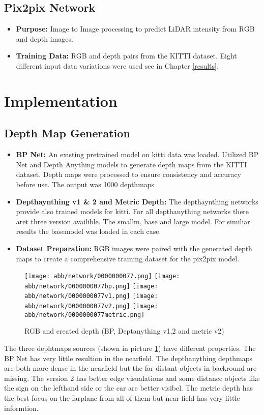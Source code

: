 \subsection{Pix2pix Network}
\begin{itemize}
	\item \textbf{Purpose:} Image to Image processing to predict LiDAR intensity from RGB and depth images.
	\item \textbf{Training Data:} RGB and depth pairs from the KITTI dataset.
	Eight different input data variations were used see in Chapter \ref{results}.
\end{itemize}

\section{Implementation}
\subsection{Depth Map Generation}
\begin{itemize}
	\item \textbf{BP Net:} An existing pretrained model on kitti data was loaded. Utilized BP Net and Depth Anything models to generate depth maps from the KITTI dataset. Depth maps were processed to ensure consistency and accuracy before use. The output was 1000 depthmaps
	
	\item \textbf{Depthaynthing v1 \& 2 and Metric Depth:} The depthaynthing networks provide also trained models for kitti. For all depthanything networks there aret three version availible. The smallm, base and large model. For similiar results the basemodel was loaded in each case.   
	
	\item \textbf{Dataset Preparation:} RGB images were paired with the generated depth maps to create a comprehensive training dataset for the pix2pix model.
	\end{itemize}
\begin{figure}[!ht]
	\centering
	\texttt{[image: abb/network/0000000077.png]}
	\texttt{[image: abb/network/0000000077bp.png]}
	\texttt{[image: abb/network/0000000077v1.png]}
	\texttt{[image: abb/network/0000000077v2.png]}
	\texttt{[image: abb/network/0000000077metric.png]}
	\caption{RGB and created depth (BP, Deptanything v1,2 and metric v2)}
	\label{all_depths}
\end{figure}
The three dephtmaps sources (shown in picture \ref{all_depths}) have different properties. The BP Net has very little resultion in the nearfield. The depthanything depthmaps are both more dense in the nearfield but the far distant objects in backround are missing. The version 2 has better edge visualations and some distance objects like the sign on the lefthand side or the car are better visibel. The metric depth has the best focus on the farplane from all of them but near field has very little informtion. 

